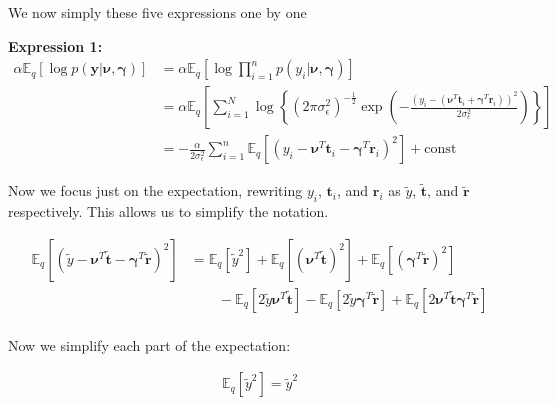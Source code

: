 \documentclass[letterpaper,12pt]{article}
\newcommand{\lc}{\left \{} %
\newcommand{\rc}{\right \}} %
\newcommand{\lp}{\left (} %
\newcommand{\rp}{\right )} %
\newcommand{\lb}{\left [} %
\newcommand{\rb}{\right ]} %
\newcommand{\sigmaepsilon}{\sigma_\epsilon^2} %
\newcommand{\nuv}{\boldsymbol{\nu}} %
\newcommand{\gammav}{\boldsymbol{\gamma}} %
\newcommand{\ti}{\boldsymbol{t}_i} %
\newcommand{\ri}{\boldsymbol{r}_i} %
\newcommand{\ytilde}{\ensuremath{\tilde{y}}} %
\newcommand{\ttilde}{\ensuremath{\tilde{\boldsymbol{t}}}} %
\newcommand{\rtilde}{\ensuremath{\tilde{\boldsymbol{r}}}} %
\newcommand{\E}{\mathbb{E}_q}
\begin{document}
We now simply these five expressions one by one

\textbf{Expression 1:}
\begin{equation}
\begin{split}
    \alpha \E \lb \log p(\boldsymbol{y} | \nuv, \gammav) \rb &= \alpha \E \lb \log \prod_{i=1}^n p(y_i | \nuv, \gammav) \rb \\
    &= \alpha \E \lb \sum \limits_{i=1}^N \log \lc (2 \pi \sigma_\epsilon^2)^{-\frac{1}{2}} \exp \left(- \frac{\left(y_i - \left(\nuv^T \ti + \gammav^T \ri \right) \right)^2}{2 \sigma_\epsilon^2} \right) \rc \rb \\
    &= -\frac{\alpha}{2 \sigmaepsilon} \sum_{i=1}^n \E \lb \lp y_i - \nuv^T \ti - \gammav^T \ri \rp^2 \rb + \textrm{const}
\end{split}
\end{equation}

Now we focus just on the expectation, rewriting $y_i$, $\ti$, and $\ri$ as $\ytilde$, $\ttilde$, and $\rtilde$ respectively. This allows us to simplify the notation.

\begin{equation}
\begin{split}
    \E \lb \lp \ytilde -\nuv^T \ttilde - \gammav^T \rtilde \rp ^2 \rb &= \E \lb \ytilde^2 \rb + \E \lb ( \nuv^T \ttilde)^2 \rb + \E \lb ( \gammav^T \rtilde)^2 \rb \\
    & \qquad - \E \lb 2 \ytilde \nuv^T \ttilde \rb - \E \lb 2 \ytilde \gammav^T \rtilde \rb + \E \lb 2 \nuv^T \ttilde \gammav^T \rtilde \rb \\
\end{split}
\end{equation}

Now we simplify each part of the expectation:

\begin{equation}
\begin{split}
     \E \lb \ytilde^2 \rb = \ytilde^2
\end{split}
\end{equation}
\end{document}

